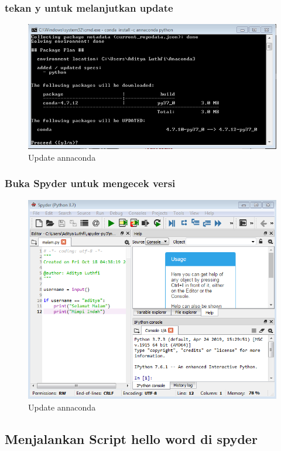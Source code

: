 \documentclass[12pt, times new roman, a4paper]{article}
\begin{document}
\subsubsection{tekan y untuk melanjutkan update}
	\begin{figure}[h]
		\centering
		\includegraphics[scale=0.3]{Gambar/c2}
		\caption{Update annaconda}
	\end{figure}
\subsubsection{Buka Spyder untuk mengecek versi}
	\begin{figure}[h]
		\centering
		\includegraphics[scale=0.2]{Gambar/c3}
		\caption{Update annaconda}
	\end{figure}	
	
\subsection{Menjalankan Script hello word di spyder}
\end{document}

